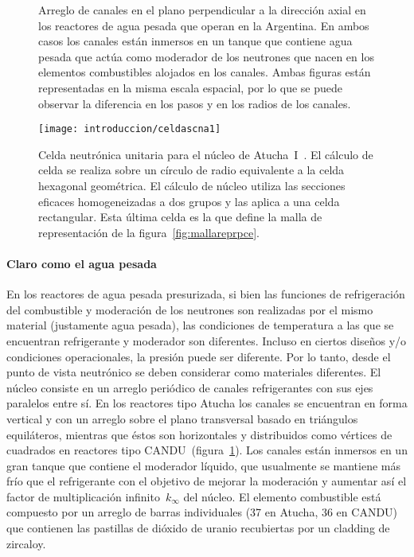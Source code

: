 \begin{figure}[p]
\begin{center}
  \hspace{2cm}
\end{center}
\caption{\label{fig:arrays}Arreglo de canales en el plano perpendicular a la dirección axial en los reactores de agua pesada que operan en la Argentina. En ambos casos los canales están inmersos en un tanque que contiene agua pesada que actúa como moderador de los neutrones que nacen en los elementos combustibles alojados en los canales. Ambas figuras están representadas en la misma escala espacial, por lo que se puede observar la diferencia en los pasos y en los radios de los canales.}
\end{figure}

\begin{figure}[p]
\begin{center}
\texttt{[image: introduccion/celdascna1]}
\end{center}
\caption{\label{fig:celdacna1} Celda neutrónica unitaria para el núcleo de Atucha~I~\cite{aatn-xs-2014}. El cálculo de celda se realiza sobre un círculo de radio equivalente a la celda hexagonal geométrica. El cálculo de núcleo utiliza las secciones eficaces homogeneizadas a dos grupos y las aplica a una celda rectangular. Esta última celda es la que define la malla de representación de la figura~\ref{fig:mallareprpce}.}
\end{figure}

\paragraph{Claro como el agua pesada}
En los reactores de agua pesada presurizada, si bien las funciones de refrigeración del combustible y moderación de los neutrones son realizadas por el mismo material (justamente agua pesada), las condiciones de temperatura a las que se encuentran refrigerante y moderador son diferentes. Incluso en ciertos diseños y/o condiciones operacionales, la presión puede ser diferente. Por lo tanto, desde el punto de vista neutrónico se deben considerar como materiales diferentes.
El núcleo consiste en un arreglo periódico de canales refrigerantes con sus ejes paralelos entre sí. En los reactores tipo Atucha los canales se encuentran en forma vertical y con un arreglo sobre el plano transversal basado en triángulos equiláteros, mientras que éstos son horizontales y distribuidos como vértices de cuadrados en reactores tipo CANDU~(figura~\ref{fig:arrays}). Los canales están inmersos en un gran tanque que contiene el moderador líquido, que usualmente se mantiene más frío que el refrigerante con el objetivo de mejorar la moderación y aumentar así el factor de multiplicación infinito~$k_\infty$ del núcleo. El elemento combustible está compuesto por un arreglo de barras individuales (37 en Atucha, 36 en CANDU) que contienen las pastillas de dióxido de uranio recubiertas por un cladding de zircaloy.

